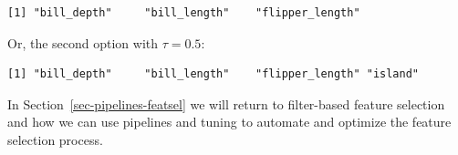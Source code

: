 \begin{Shaded}
\begin{Highlighting}[]
\OtherTok{=} \NormalTok{(}\NormalTok{)}
\OtherTok{=} \NormalTok{(}\NormalTok{)}
\SpecialCharTok{$}

\OtherTok{=} \NormalTok{(}\SpecialCharTok{$}\NormalTok{))}
\SpecialCharTok{$}
\SpecialCharTok{$}
\end{Highlighting}
\end{Shaded}

\begin{verbatim}
[1] "bill_depth"     "bill_length"    "flipper_length"
\end{verbatim}

Or, the second option with \(\tau = 0.5\):

\begin{Shaded}
\begin{Highlighting}[]
\OtherTok{=} \NormalTok{(}\NormalTok{)}
\OtherTok{=} \NormalTok{(}\NormalTok{)}
\SpecialCharTok{$}

\OtherTok{=} \NormalTok{(}\SpecialCharTok{$}\SpecialCharTok{\textgreater{}} \NormalTok{))}
\SpecialCharTok{$}
\SpecialCharTok{$}
\end{Highlighting}
\end{Shaded}

\begin{verbatim}
[1] "bill_depth"     "bill_length"    "flipper_length" "island"        
\end{verbatim}

In Section~\ref{sec-pipelines-featsel} we will return to filter-based
feature selection and how we can use pipelines and
tuning to automate and optimize the feature selection process.

